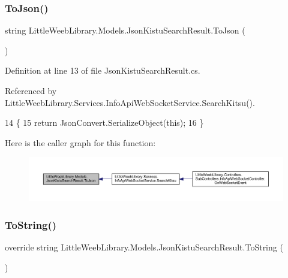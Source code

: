\subsubsection{\texorpdfstring{To\+Json()}{ToJson()}}
{\footnotesize\ttfamily string Little\+Weeb\+Library.\+Models.\+Json\+Kistu\+Search\+Result.\+To\+Json (\begin{DoxyParamCaption}{ }\end{DoxyParamCaption})}



Definition at line 13 of file Json\+Kistu\+Search\+Result.\+cs.



Referenced by Little\+Weeb\+Library.\+Services.\+Info\+Api\+Web\+Socket\+Service.\+Search\+Kitsu().


\begin{DoxyCode}
14         \{
15             \textcolor{keywordflow}{return} JsonConvert.SerializeObject(\textcolor{keyword}{this});
16         \}
\end{DoxyCode}
Here is the caller graph for this function\+:\nopagebreak
\begin{figure}[H]
\begin{center}
\leavevmode
\includegraphics[width=350pt]{class_little_weeb_library_1_1_models_1_1_json_kistu_search_result_a6adca32faf08b7fb63c9f469ab3fbcae_icgraph}
\end{center}
\end{figure}
\mbox{\label{class_little_weeb_library_1_1_models_1_1_json_kistu_search_result_a24e08aec40ba54db7235bb4ef9be8b11}} 
\subsubsection{\texorpdfstring{To\+String()}{ToString()}}
{\footnotesize\ttfamily override string Little\+Weeb\+Library.\+Models.\+Json\+Kistu\+Search\+Result.\+To\+String (\begin{DoxyParamCaption}{ }\end{DoxyParamCaption})}



